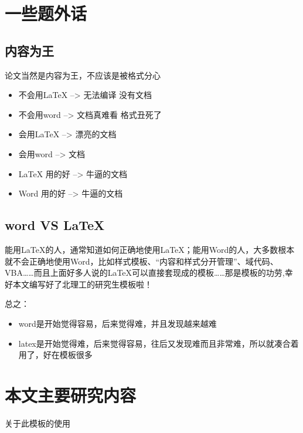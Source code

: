 \section{一些题外话}
\subsection{内容为王}
论文当然是内容为王，不应该是被格式分心
\begin{itemize}
	\item 不会用LaTeX --> 无法编译 没有文档
\item	不会用word --> 文档真难看 格式丑死了
	
\item 	会用LaTeX --> 漂亮的文档
\item	会用word --> 文档
	
\item	LaTeX 用的好 --> 牛逼的文档
\item	Word 用的好 --> 牛逼的文档
\end{itemize}

\subsection{word VS \LaTeX{}}
能用LaTeX的人，通常知道如何正确地使用LaTeX；能用Word的人，大多数根本就不会正确地使用Word，比如样式模板、“内容和样式分开管理”、域代码、VBA……而且上面好多人说的LaTeX可以直接套现成的模板……那是模板的功劳,幸好本文编写好了北理工的研究生模板啦！

总之：
\begin{itemize}
	\item word是开始觉得容易，后来觉得难，并且发现越来越难
	\item latex是开始觉得难，后来觉得容易，往后又发现难而且非常难，所以就凑合着用了，好在模板很多
\end{itemize}

\section{本文主要研究内容}
关于此模板的使用


